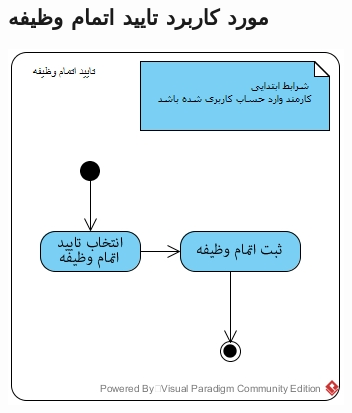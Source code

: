 \subsection*{مورد کاربرد تایید اتمام وظیفه}
\vspace{2cm}
\begin{center}
\includegraphics[width=\textwidth]{ActivityDiagrams/30.jpg}
\end{center}

\newpage
\vspace{2cm}
